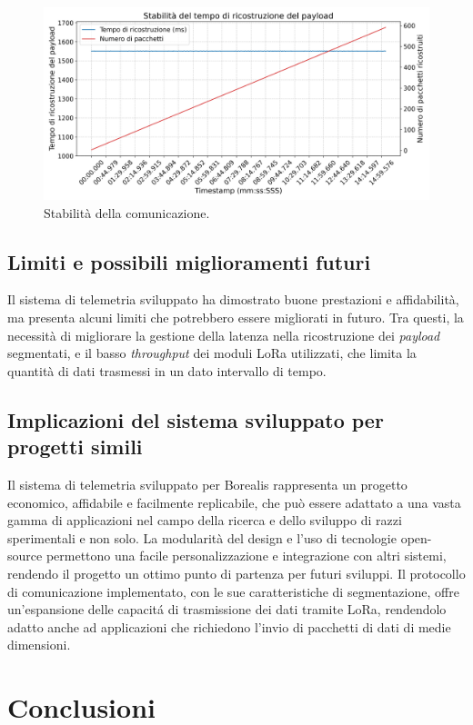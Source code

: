 \documentclass[12pt,a4paper,twoside]{book}
\begin{document}
\begin{figure}[H]
    \centering
    \includegraphics[width=\textwidth]{img/tests/T5/T5.png}
    \caption{Stabilità della comunicazione.}
    \label{fig:telemetry-robustness-test}
\end{figure}
\newpage
\section{Limiti e possibili miglioramenti futuri}
Il sistema di telemetria sviluppato ha dimostrato buone prestazioni e affidabilità, ma presenta
alcuni limiti che potrebbero essere migliorati in futuro.
Tra questi, la necessità di migliorare la gestione della latenza nella ricostruzione dei \emph{payload} segmentati,
e il basso \emph{throughput} dei moduli \ac{LoRa} utilizzati, che limita la quantità di dati trasmessi in un dato intervallo di tempo.

\section{Implicazioni del sistema sviluppato per progetti simili}
Il sistema di telemetria sviluppato per Borealis rappresenta un progetto economico,
affidabile e facilmente replicabile, che può essere adattato a una vasta gamma di applicazioni
nel campo della ricerca e dello sviluppo di razzi sperimentali e non solo.
La modularità del design e l'uso di tecnologie open-source permettono una facile
personalizzazione e integrazione con altri sistemi, rendendo il progetto un
ottimo punto di partenza per futuri sviluppi.
Il protocollo di comunicazione implementato, con le sue caratteristiche di segmentazione, 
offre un'espansione delle capacit\'a di trasmissione dei dati tramite \ac{LoRa}, 
rendendolo adatto anche ad applicazioni che richiedono l'invio di pacchetti di dati 
di medie dimensioni. 

\chapter{Conclusioni} \label{chap:conclusion}
\end{document}
